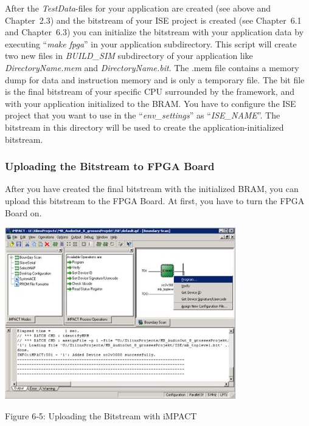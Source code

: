 \documentclass[
]{article}
\begin{document}
After the \emph{TestData}-files for your application are created (see
above and Chapter~2.3) and the bitstream of your ISE project is created
(see Chapter~6.1 and Chapter~6.3) you can initialize the bitstream with
your application data by executing ``\emph{make fpga}'' in your
application subdirectory. This script will create two new files in
\emph{BUILD\_SIM} subdirectory of your application like
\emph{DirectoryName.mem} and \emph{DirectoryName.bit}. The .mem file
contains a memory dump for data and instruction memory and is only a
temporary file. The bit file is the final bitstream of your specific CPU
surrounded by the framework, and with your application initialized to
the BRAM. You have to configure the ISE project that you want to use in
the ``\emph{env\_settings}'' as ``\emph{ISE\_NAME}''. The bitstream in
this directory will be used to create the application-initialized
bitstream.

\hypertarget{uploading-the-bitstream-to-fpga-board}{%
\subsubsection{Uploading the Bitstream to FPGA
Board}\label{uploading-the-bitstream-to-fpga-board}}

After you have created the final bitstream with the initialized BRAM,
you can upload this bitstream to the FPGA Board. At first, you have to
turn the FPGA Board on.

\includegraphics[width=3.94849in,height=2.93699in]{6-5.png}

Figure 6‑5: Uploading the Bitstream with iMPACT
\end{document}
